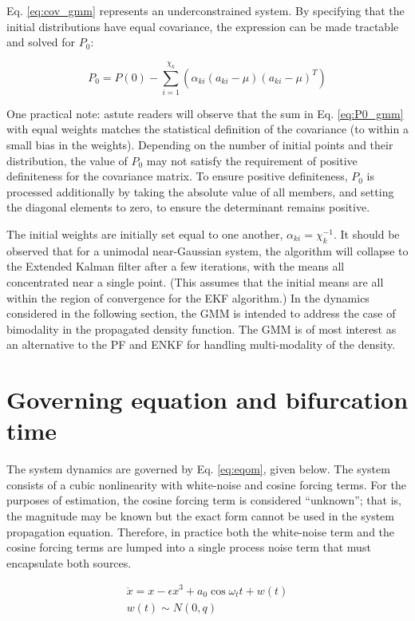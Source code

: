 \documentclass[]{article}
\begin{document}
Eq. \ref{eq:cov_gmm} represents an underconstrained system. By specifying that the initial distributions have equal covariance, the expression can be made tractable and solved for $P_{0}$:

\begin{equation}
	P_{0} = P(0) - \sum_{i=1}^{\chi_k} (\alpha_{ki}(a_{ki}-\mu)(a_{ki}-\mu)^T)
	\label{eq:P0_gmm}
\end{equation}

One practical note: astute readers will observe that the sum in Eq. \ref{eq:P0_gmm} with equal weights matches the statistical definition of the covariance (to within a small bias in the weights). Depending on the number of initial points and their distribution, the value of $P_{0}$ may not satisfy the requirement of positive definiteness for the covariance matrix. To ensure positive definiteness, $P_{0}$ is processed additionally by taking the absolute value of all members, and setting the diagonal elements to zero, to ensure the determinant remains positive.

The initial weights are initially set equal to one another, $\alpha_{ki} = \chi_k^{-1}$. It should be observed that for a unimodal near-Gaussian system, the algorithm will collapse to the Extended Kalman filter after a few iterations, with the means all concentrated near a single point. (This assumes that the initial means are all within the region of convergence for the EKF algorithm.) In the dynamics considered in the following section, the GMM is intended to address the case of bimodality in the propagated density function. The GMM is of most interest as an alternative to the PF and ENKF for handling multi-modality of the density.

\section{Governing equation and bifurcation time}

The system dynamics are governed by Eq. \ref{eq:eqom}, given below. The system consists of a cubic nonlinearity with white-noise and cosine forcing terms. For the purposes of estimation, the cosine forcing term is considered ``unknown''; that is, the magnitude may be known but the exact form cannot be used in the system propagation equation. Therefore, in practice both the white-noise term and the cosine forcing terms are lumped into a single process noise term that must encapsulate both sources.

\begin{align}
\ddot{x} = x - \epsilon x^3 + a_0 \cos{\omega_t t} + w(t) \label{eq:eqom} \\
w(t) \sim N(0,q)
\end{align}
\end{document}
